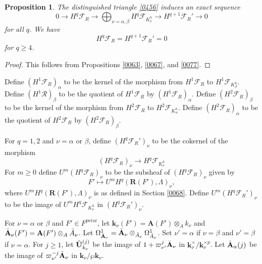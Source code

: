 \documentclass{amsart}
\newtheorem{Prop}[Thm]{Proposition}
\theoremstyle{remark}
\numberwithin{equation}{subsection}
\newcommand{\tensor}{\mathbin{\otimes}}
\newcommand{\perar}{\mathrm{perar}}
\newcommand{\alg}[1]{\mathbf{#1}}
\begin{document}
\begin{Prop} \label{0288}
	The distinguished triangle \eqref{0456} induces an exact sequence
		\[
				0
			\to
				H^{q} \mathcal{F}_{R}
			\to
				\bigoplus_{\nu = \alpha, \beta}
					H^{q} \mathcal{F}_{K_{\nu}^{h}}
			\to
				H^{q + 1} \mathcal{F}_{R}'
			\to
				0
		\]
	for all $q$.
	We have
		\[
				H^{q} \mathcal{F}_{R}
			=
				H^{q + 1} \mathcal{F}_{R}'
			=
				0
		\]
	for $q \ge 4$.
\end{Prop}

\begin{proof}
	This follows from Propositions
	\ref{0063},
	\ref{0067},
	and \ref{0077}.
\end{proof}

Define $(H^{1} \mathcal{F}_{R})_{\alpha}$
to be the kernel of
the morphism from $H^{1} \mathcal{F}_{R}$
to $H^{1} \mathcal{F}_{K_{\beta}^{h}}$.
Define $(H^{1} \mathcal{R})_{\beta}$
to be the quotient of $H^{1} \mathcal{F}_{R}$
by $(H^{1} \mathcal{F}_{R})_{\alpha}$.
Define $(H^{2} \mathcal{F}_{R})_{\beta}$
to be the kernel of
the morphism from $H^{2} \mathcal{F}_{R}$
to $H^{2} \mathcal{F}_{K_{\alpha}^{h}}$.
Define $(H^{2} \mathcal{F}_{R})_{\alpha}$
to be the quotient of $H^{2} \mathcal{F}_{R}$
by $(H^{2} \mathcal{F}_{R})_{\beta}$.

For $q = 1, 2$ and $\nu = \alpha$ or $\beta$,
define $(H^{q} \mathcal{F}_{R}')_{\nu}$ to be the cokernel of the morphism
	\[
			(H^{q} \mathcal{F}_{R})_{\nu}
		\to
			H^{q} \mathcal{F}_{K_{\nu}^{h}}
	\]
For $m \ge 0$
define $U^{m} (H^{q} \mathcal{F}_{R})_{\nu}$
to be the subsheaf of $(H^{q} \mathcal{F}_{R})_{\nu}$ given by
	\[
			F'
		\mapsto
			U^{m} H^{q}(\alg{R}(F'), \Lambda)_{\nu},
	\]
where $U^{m} H^{q}(\alg{R}(F'), \Lambda)_{\nu}$ is as defined in
Section \ref{0068}.
Define $U^{m} (H^{q} \mathcal{F}_{R}')_{\nu}$ to be the image of
$U^{m} H^{q} \mathcal{F}_{K_{\nu}^{h}}$
in $(H^{q} \mathcal{F}_{R}')_{\nu}$.

For $\nu = \alpha$ or $\beta$ and $F' \in F^{\perar}$,
let $\alg{k}_{\nu}(F') = \alg{A}(F') \tensor_{A} k_{\nu}$
and $\Bar{\alg{A}}_{\nu}(F') = \alg{A}(F') \tensor_{A} \Bar{A}_{\nu}$.
Let $\Omega_{\Bar{\alg{A}}_{\nu}}^{1} = \Bar{\alg{A}}_{\nu} \tensor_{\Bar{A}_{\nu}} \Omega_{\Bar{A}_{\nu}}^{1}$.
Set $\nu' = \alpha$ if $\nu = \beta$ and $\nu' = \beta$ if $\nu = \alpha$.
For $j \ge 1$, let $\Tilde{\alg{U}}_{k_{\nu}}^{(j)}$ be the image of
$1 + \varpi_{\nu'}^{j} \Bar{\alg{A}}_{\nu}$ in
$\alg{k}_{\nu}^{\times} / \alg{k}_{\nu}^{\times p}$.
Let $\Tilde{\alg{A}}_{\alpha}(j)$ be the image of
$\varpi_{\nu'}^{-j} \Bar{\alg{A}}_{\nu}$ in $\alg{k}_{\nu} / \wp \alg{k}_{\nu}$.
\end{document}
